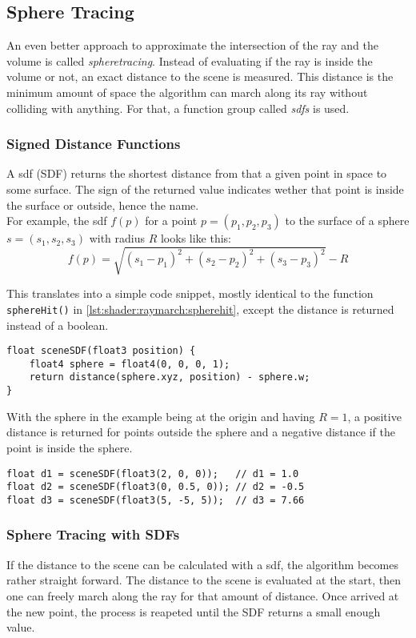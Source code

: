 \pagebreak
\subsection{Sphere Tracing}
An even better approach to approximate the intersection of the ray and the volume is called \textit{\gls{spheretracing}}. 
Instead of evaluating if the ray is inside the volume or not, an exact distance to the scene is measured. This distance is the minimum amount of space the algorithm can march along its ray without colliding with anything.
For that, a function group called \textit{\gls{sdf}s} is used.

\subsubsection{Signed Distance Functions}
A \gls{sdf} (SDF) returns the shortest distance from that a given point in space to some surface.
The sign of the returned value indicates wether that point is inside the surface or outside, hence the name.
\\
For example, the \gls{sdf} $f(p)$ for a point $p=(p_1, p_2, p_3)$ to the surface of a sphere $s=(s_1, s_2, s_3)$ with radius $R$ looks like this:
$$ f(p) = \sqrt{(s_1 - p_1)^2 + (s_2 - p_2)^2 + (s_3 - p_3)^2} - R $$

\noindent
This translates into a simple code snippet, mostly identical to the function \lstinline[language=HLSL]{sphereHit()} in \autoref{lst:shader:raymarch:spherehit}, except the distance is returned instead of a boolean.
\begin{lstlisting}[language=HLSL, caption=Implementation of a signed distance function for a sphere., label=lst:shader:raymarch:spheredistance]
float sceneSDF(float3 position) {
    float4 sphere = float4(0, 0, 0, 1);
    return distance(sphere.xyz, position) - sphere.w;
}
\end{lstlisting}

\noindent
With the sphere in the example being at the origin and having $R = 1$, a positive distance is returned for points outside the sphere and a negative distance if the point is inside the sphere.
\begin{lstlisting}[language=HLSL]
float d1 = sceneSDF(float3(2, 0, 0));   // d1 = 1.0
float d2 = sceneSDF(float3(0, 0.5, 0)); // d2 = -0.5
float d3 = sceneSDF(float3(5, -5, 5));  // d3 = 7.66
\end{lstlisting}

\subsubsection{Sphere Tracing with SDFs}
If the distance to the scene can be calculated with a \gls{sdf}, the algorithm becomes rather straight forward. The distance to the scene is evaluated at the start, then one can freely march along the ray for that amount of distance. Once arrived at the new point, the process is reapeted until the SDF returns a small enough value.


